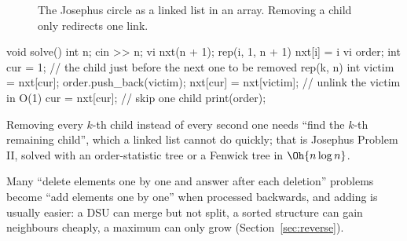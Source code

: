 \begin{figure}[htbp]
\centering
{}
\caption{The Josephus circle as a linked list in an array. Removing a child only redirects one link.}
\label{fig:josephus}
\end{figure}

\begin{code}
void solve() {
    int n;
    cin >> n;
    vi nxt(n + 1);
    rep(i, 1, n + 1) nxt[i] = i %
    vi order;
    int cur = 1;  // the child just before the next one to be removed
    rep(k, n) {
        int victim = nxt[cur];
        order.push_back(victim);
        nxt[cur] = nxt[victim];  // unlink the victim in O(1)
        cur = nxt[cur];          // skip one child
    }
    print(order);
}
\end{code}

Removing every $k$-th child instead of every second one needs ``find the $k$-th remaining child'', which a linked list
cannot do quickly; that is Josephus Problem II, solved with an order-statistic tree or a Fenwick tree in $\Oh{n \log n}$.

\begin{trick}
Many ``delete elements one by one and answer after each deletion'' problems become ``add elements one by one'' when processed
backwards, and adding is usually easier: a DSU can merge but not split, a sorted structure can gain neighbours cheaply, a
maximum can only grow (Section~\ref{sec:reverse}).
\end{trick}

